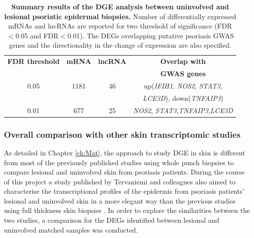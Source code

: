

\begin{table}[htbp]
\centering
\begin{tabular}{@{} c c c c}
\toprule
\textbf{FDR threshold}   & \textbf{mRNA}   & \textbf{lncRNA}  & \textbf{Overlap with}\\
                         &                 &                  & \textbf{GWAS genes}\\
\midrule
\midrule
0.05                     & 1181            & 46               &  up(\textit{IFIH1}, \textit{NOS2}, \textit{STAT3},\\ 
                         &                 &                  &  \textit{LCE3D}), down(\textit{TNFAIP3}) \\
0.01                     &  677            & 25               &  \textit{NOS2}, \textit{STAT3},\textit{TNFAIP3},\textit{LCE3D} \\
\bottomrule 
\end{tabular}
\medskip %
\caption[Summary results of the DGE analysis between uninvolved and lesional psoriatic epidermal biopsies.]{\textbf{Summary results of the DGE analysis between uninvolved and lesional psoriatic epidermal biopsies.} Number of differentially expressed mRNAs and lncRNAs are reported for two threshold of significance (FDR$<$0.05 and FDR$<$0.01). The DEGs overlapping putative psoriasis GWAS genes and the directionality in the change of expression are also specified.}
\label{tab:RNAseq_PS_lesional_uninvolved_DGE_results}
\end{table}
\bigskip %




\subsubsection{Overall comparison with other skin transcriptomic studies}

As detailed in Chapter \ref{ch:Mat}, the approach to study DGE in skin is different from most of the previously published studies using whole punch biopsies to compare lesional and uninvolved skin from psoriasis patients. During the course of this project a study published by Tervaniemi and colleagues also aimed to characterise the transcriptional profiles of the epidermis from psoriasis patients’ lesional and uninvolved skin in a more elegant way than the previous studies using full thickness skin biopsies \parencite{Tervaniemi2016}. %
In order to explore the similarities between the two studies, a comparison for the DEGs identified between lesional and uninvolved matched samples was conducted. 

